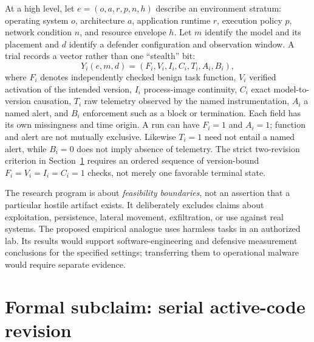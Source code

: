 \documentclass[11pt,letterpaper]{article}
\begin{document}
At a high level, let $e=(o,a,r,p,n,h)$ describe an environment stratum: operating system $o$, architecture $a$, application runtime $r$, execution policy $p$, network condition $n$, and resource envelope $h$. Let $m$ identify the model and its placement and $d$ identify a defender configuration and observation window. A trial records a vector rather than one ``stealth'' bit:
\begin{equation}
Y_i(e,m,d)=(F_i,V_i,I_i,C_i,T_i,A_i,B_i),\label{eq:outcomes}
\end{equation}
where $F_i$ denotes independently checked benign task function, $V_i$ verified activation of the intended version, $I_i$ process-image continuity, $C_i$ exact model-to-version causation, $T_i$ raw telemetry observed by the named instrumentation, $A_i$ a named alert, and $B_i$ enforcement such as a block or termination. Each field has its own missingness and time origin. A run can have $F_i=1$ and $A_i=1$; function and alert are not mutually exclusive. Likewise $T_i=1$ need not entail a named alert, while $B_i=0$ does not imply absence of telemetry. The strict two-revision criterion in Section~\ref{sec:claim} requires an ordered sequence of version-bound $F_i=V_i=I_i=C_i=1$ checks, not merely one favorable terminal state.

The research program is about \emph{feasibility boundaries}, not an assertion that a particular hostile artifact exists. It deliberately excludes claims about exploitation, persistence, lateral movement, exfiltration, or use against real systems. The proposed empirical analogue uses harmless tasks in an authorized lab. Its results would support software-engineering and defensive measurement conclusions for the specified settings; transferring them to operational malware would require separate evidence.

\section{Formal subclaim: serial active-code revision}\label{sec:claim}
\end{document}
